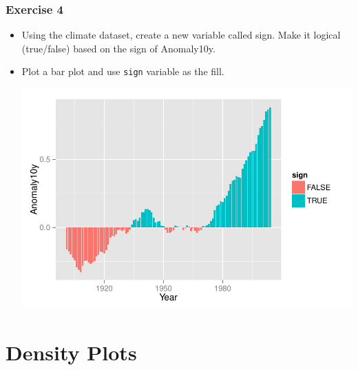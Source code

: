 \documentclass{beamer}\usepackage[]{graphicx}\usepackage[]{color}
\newenvironment{knitrout}{}{} %
\begin{document}

\begin{frame}[fragile]
\frametitle{Exercise 4}
\begin{itemize}
\item Using the climate dataset, create a new variable called sign. Make it logical (true/false) based on the sign of Anomaly10y.
\item Plot a bar plot and use \texttt{sign} variable as the fill.\\
\begin{knitrout}\footnotesize
{}\color{fgcolor}

{\centering \includegraphics[width=.75\linewidth]{figure/ex4} 

}



\end{knitrout}


\end{itemize}
\end{frame}


\section*{Density Plots}
\frame{\sectionpage}

\end{document}
